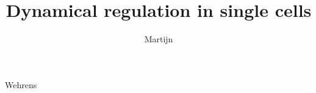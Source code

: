\documentclass[nativefonts,print]{Style/class_dissertation}
\begin{document}


\title{Dynamical regulation in single cells}
\author{Martijn}{Wehrens} %

\frontmatter



\setcounter{tocdepth}{1} %
\tableofcontents

\mainmatter

\thumbtrue



\thumbfalse


\thumbtrue










\end{document}
